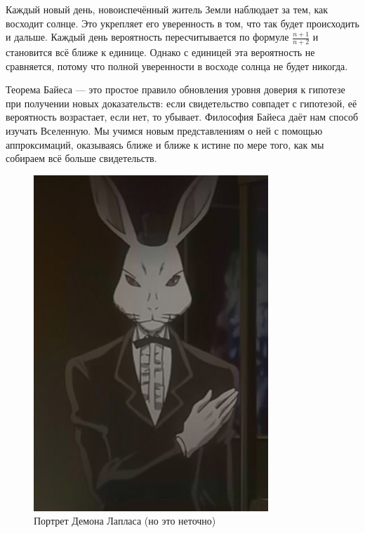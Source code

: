 \documentclass[12pt, a4paper, oneside]{extreport}
\theoremstyle{plain}              %
\theoremstyle{definition}         %
\begin{document}
Каждый новый день, новоиспечённый житель Земли наблюдает за тем, как восходит солнце. Это укрепляет его уверенность в том, что так будет происходить и дальше.  Каждый день вероятность пересчитывается по формуле $\frac{n+1}{n+2}$ и становится всё ближе к единице. Однако с единицей эта вероятность не сравняется, потому что полной уверенности в восходе солнца не будет никогда.

Теорема Байеса --- это простое правило обновления уровня доверия к гипотезе при получении новых доказательств: если свидетельство совпадет с гипотезой, её вероятность возрастает, если нет, то убывает.   Философия Байеса даёт нам способ изучать Вселенную. Мы учимся новым представлениям о ней с помощью аппроксимаций, оказываясь ближе и ближе к истине по мере того, как мы собираем всё больше свидетельств.

\begin{figure}
	\centering \includegraphics[width=0.8\linewidth]{images/demon.jpg}
	\caption{Портрет Демона Лапласа (но это неточно)}
\end{figure} 
\end{document}
